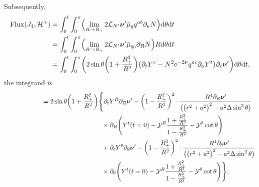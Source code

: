 \documentclass[pdftex]{sigma}
\def\ptl{\partial}%
\def\mbo#1{\boldsymbol{#1}}%
\numberwithin{equation}{section}
\begin{document}
Subsequently,
\begin{align*}
{\rm Flux} (J_4, \mathcal{H}^+) &{}= \int^t_0 \int^\pi _0 \Bigl(\lim_{R \to R_+} 2 \mathcal{L}_{N'} \mbo{\nu}' \bar{\mu}_q q^{ab} \ptl_a N \Bigr) {\rm d}\theta {\rm d}t \notag\\
&{}= \int^t_0 \int^\pi _0 \Bigl(\lim_{R \to R_+} 2 \mathcal{L}_{N'} \mbo{\nu}' \bar{\mu}_{q_0} \ptl_R N \Bigr) R {\rm d}\theta {\rm d}t \notag\\
&{}= \int^t_0 \int^\pi _0 \biggl(2 \sin \theta \biggl(1+ \frac{R^2_+}{R^2} \biggr) \bigl(\ptl_t Y^c - N^2 {\rm e}^{-2 \mbo{\nu}} q^{ac} \ptl_a Y^t\bigr) \ptl_c \mbo{\nu}' \biggr) {\rm d}\theta {\rm d}t,
\end{align*}
the integrand is
\begin{align*}
\hphantom{{\rm Flux} (J_4, \mathcal{H}^+)}&{}= 2 \sin \theta \biggl(1+ \frac{R^2_+}{R^2} \biggr) \Biggl\{ \ptl_t Y^R \ptl_R \mbo{\nu}' - \biggl(1- \frac{R^2_+}{R^2} \biggr)^2 \cdot \frac{R^4 \ptl_R \mbo{\nu}'}{ \bigl( \bigl(r^2+a^2\bigr)^2 -a^2 \Delta
	\sin^2 \theta \bigr)} \notag\\
& \hphantom{= 2 \sin \theta \biggl(1+ \frac{R^2_+}{R^2} \biggr) \Biggl\{}{}
\times \ptl_R \Biggl(Y^t (t=0) - \mathcal{Y}^R \frac{1 + \frac{R^2_+}{R^2}} {{1-\frac{R^2_+}{R^2}} } - \mathcal{Y}^ \theta \cot \theta \Biggr) \notag\\
&\hphantom{= 2 \sin \theta \biggl(1+ \frac{R^2_+}{R^2} \biggr) \Biggl\{}{}
+ \ptl_t Y^\theta \ptl_\theta \mbo{\nu}' - \biggl(1 - \frac{R^2_+}{R^2} \biggr)^2 \cdot \frac{R^4 \ptl_\theta \mbo{\nu}'}{ \bigl(\bigl(r^2+a^2\bigr)^2 -a^2 \Delta \sin^2 \theta\bigr)} \notag\\
& \hphantom{= 2 \sin \theta \biggl(1+ \frac{R^2_+}{R^2} \biggr) \Biggl\{}{}
\times \ptl_\theta \Biggl(Y^t(t=0) - \mathcal{Y}^R \frac{1+ \frac{R^2_+}{R^2}}{1-\frac{R^2_+}{R^2}} - \mathcal{Y}^\theta \cot \theta \Biggr) \Biggr\}.
\end{align*}
\end{document}
